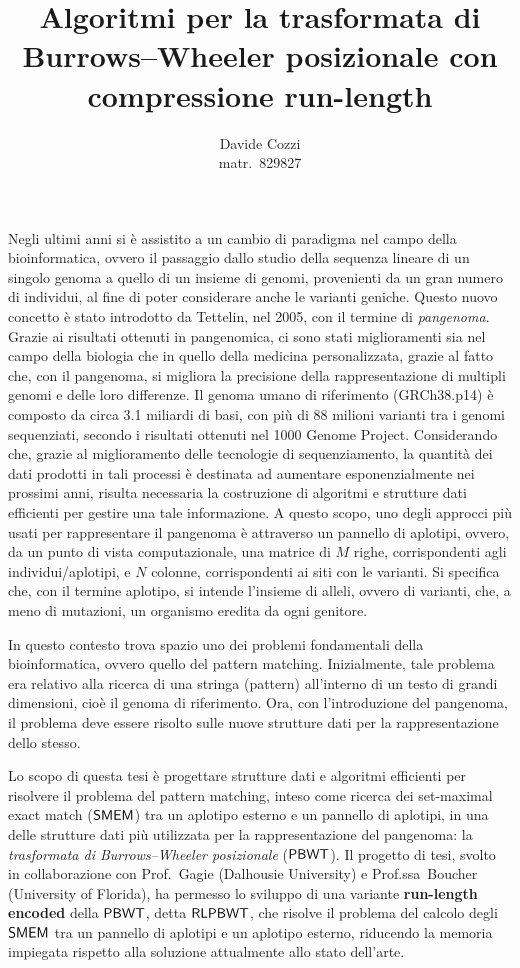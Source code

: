 \documentclass[a4paper,11pt, oneside,italian]{article}
\title{Algoritmi per la trasformata di Burrows--Wheeler
  posizionale con compressione run-length}
\author{Davide Cozzi\\\smaller matr.~829827}
\date{}
\def\PBWT{\mbox{\rm {\sf PBWT}}}
\def\RLPBWT{\mbox{\rm {\sf RLPBWT}}}
\def\SMEM{\mbox{\rm {\sf SMEM}}}
\begin{document}
\maketitle
{}
\noindent
Negli ultimi anni si è assistito a un cambio di paradigma nel campo della
bioinformatica, ovvero il passaggio dallo studio della sequenza lineare di un
singolo genoma a quello di un insieme di genomi, provenienti da un gran numero
di individui, al fine di poter considerare anche le varianti
  geniche. Questo nuovo concetto è stato introdotto da
Tettelin, nel 2005, con il termine di \textit{pangenoma}. Grazie ai risultati
ottenuti in pangenomica, ci sono stati miglioramenti sia nel 
campo della biologia che in quello della medicina personalizzata, grazie al
fatto che, con il pangenoma, si migliora la precisione della rappresentazione di
multipli genomi e delle loro differenze. 
Il genoma umano di riferimento (GRCh38.p14) è composto da circa
3.1 miliardi di basi, con più di 88 milioni 
varianti tra i genomi sequenziati, secondo i risultati ottenuti nel 1000 Genome
Project. Considerando che, grazie al
miglioramento delle tecnologie di sequenziamento, la quantità dei dati prodotti
in tali processi è destinata 
ad aumentare esponenzialmente nei prossimi anni, risulta necessaria la
costruzione di algoritmi e   
strutture dati efficienti per gestire una tale informazione.
A questo scopo, uno degli approcci più usati per rappresentare il pangenoma è
attraverso un 
pannello di aplotipi, ovvero, da un punto di vista computazionale, una matrice
di $M$ 
righe, corrispondenti agli individui/aplotipi, e $N$ colonne, corrispondenti ai siti con
le varianti. Si specifica che, con il termine
aplotipo, si intende l'insieme di alleli, ovvero di varianti, che, a meno di
mutazioni, un organismo eredita da ogni genitore.

In questo contesto trova spazio uno dei problemi fondamentali della
bioinformatica, ovvero quello del pattern matching. Inizialmente, tale problema
era relativo alla ricerca di una stringa (pattern) all'interno di un testo di
grandi dimensioni, cioè il genoma di riferimento.
Ora, con l'introduzione del pangenoma, il problema deve essere risolto sulle
nuove strutture dati per la 
 rappresentazione dello stesso.

Lo scopo di questa tesi è progettare strutture dati e algoritmi efficienti per
risolvere il problema del pattern 
matching, inteso come ricerca dei set-maximal exact match ($\SMEM$) tra un
aplotipo 
esterno e un pannello di aplotipi, in una delle 
strutture dati più utilizzata per la rappresentazione del pangenoma: la
\textit{trasformata di Burrows--Wheeler 
  posizionale} ($\PBWT$). Il progetto di tesi, svolto in collaborazione con
Prof.~Gagie (Dalhousie University) e Prof.ssa~Boucher 
(University of Florida), ha permesso lo sviluppo di una variante
\textbf{run-length encoded} della $\PBWT$, detta $\RLPBWT$, che
risolve il problema del calcolo degli $\SMEM$  tra un
pannello di aplotipi e un aplotipo esterno, riducendo la memoria impiegata
rispetto 
alla soluzione attualmente allo stato dell'arte.
\end{document}

